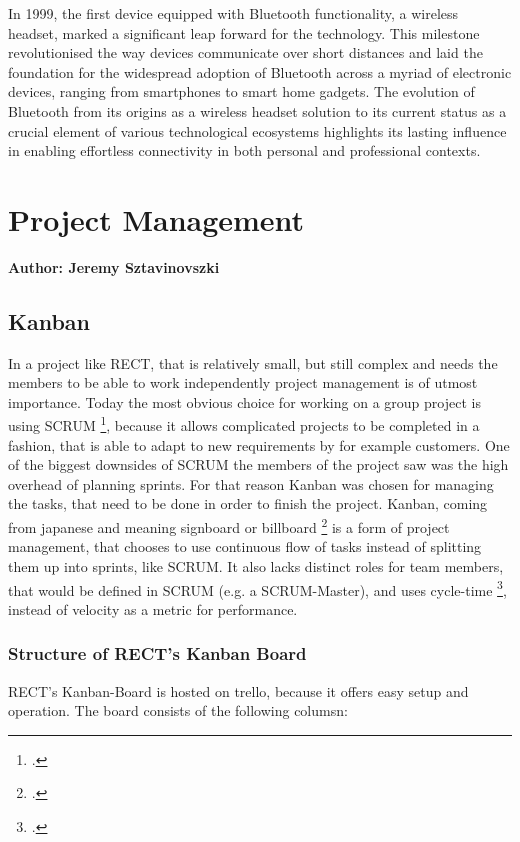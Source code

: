 In 1999, the first device equipped with Bluetooth functionality, a wireless headset, marked a significant leap forward for the technology. This milestone 
revolutionised the way devices communicate over short distances and laid the foundation for the widespread adoption of Bluetooth across a myriad of electronic 
devices, ranging from smartphones to smart home gadgets. The evolution of Bluetooth from its origins as a wireless headset solution to its current status as a 
crucial element of various technological ecosystems highlights its lasting influence in enabling effortless connectivity in both personal and professional contexts.

\section{Project Management}
\textbf{Author: Jeremy Sztavinovszki}

\subsection{Kanban}
In a project like RECT, that is relatively small, but still complex and needs the members to be able to work independently project management is of utmost importance. Today the most
obvious choice for working on a group project is using SCRUM \footcite{what-is-scrum}, because it allows complicated projects to be completed in a fashion, 
that is able to adapt to new requirements by for example customers. One of the biggest downsides of SCRUM the members of the project saw was the high overhead of planning sprints. 
For that reason Kanban was chosen for managing the tasks, that need to be done in order to finish the project. Kanban, coming from japanese and meaning signboard or billboard 
\footcite{what-is-kanban} is a form of project management, that chooses to use continuous flow of tasks instead of splitting them up into sprints, like SCRUM. 
It also lacks distinct roles for team members, that would be defined in SCRUM (e.g. a SCRUM-Master), and uses cycle-time \footcite{cycle-time-lead-time},
instead of velocity as a metric for performance. 

\subsubsection{Structure of RECT's Kanban Board}
RECT's Kanban-Board is hosted on trello, because it offers easy setup and operation. The board consists of the following columsn:


